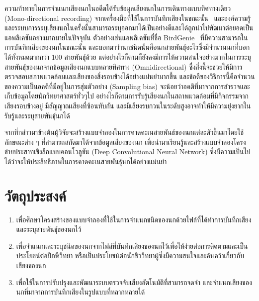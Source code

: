 ความท้าทายในการจำแนกเสียงนกในอดีตได้รับข้อมูลเสียงนกในการเดินทางแบบทิศทางเดียว (Mono-directional recording) จากเครื่องมือที่ใช้ในการบันทึกเสียงในขณะนั้น~\cite{Kahl2019} และองค์ความรู้และระบบการระบุเสียงนกในครั้งนั้นสามารถระบุออกมาได้เป็นอย่างดีและได้ถูกนำไปพัฒนาต่อยอดเป็นแอพลิเคชันอย่างมากมายในปัจจุบัน 
ตัวอย่างเช่นแอพลิเคชันที่ชื่อ BirdGenie~\cite{birdgenie} ที่มีความสามารถในการบันทึกเสียงของนกในขณะนั้น และบอกมาว่านกชนิดนั้นคือนกสายพันธุ์อะไรซึ่งมีจำนวนนกที่บอกได้ทั้งหมดมากกว่า 100 สายพันธุ์ด้วย แต่อย่างไรก็ตามก็ยังคงมีการให้ความสนใจอย่างมากในการระบุสายพันธุ์ของนกจากข้อมูลเสียงนกแบบหลายทิศทาง (Omnidirectional)
ซึ่งสิ่งนี้จะช่วยให้มีการตรวจสอบสภาพแวดล้อมและเสียงของสิ่งรอบข้างได้อย่างแม่นยำมากขึ้น และข้อดีของวิธีการนี้คือจำนวนของความเป็นอคติที่มีอยู่ในการสุ่มตัวอย่าง (Sampling bias) จะน้อยว่าอคติที่มาจากการสำรวจและเก็บข้อมูลโดยนักวิทยาศาสตร์ทั่วๆไป อย่างไรก็ตามการรับรู้เสียงนกในสถาพแวดล้อมที่มีกิจกรรมจากเสียงรอบข้างอยู่ 
มีสัญญาณเสียงที่ซ้อนทับกัน และมีเสียงรบกวนในระดับสูงอาจทำให้มีความยุ่งยากในรับรู้และระบุสายพันธุ์นกได้ \par

จากที่กล่าวมาข้างต้นผู้วิจัยจะสร้างแบบจำลองในการคาดคะเนสายพันธ์ของนกแต่ละตัวขึ้นมาโดยใช้ลักษณะต่าง ๆ ที่สามารถสกัดมาได้จากข้อมูลเสียงของนก เพื่อนำมาเรียนรู้และสร้างแบบจำลองโครงข่ายประสาทเชิงลึกแบบคอนโวลูชัน (Deep Convolutional Neural Network) 
ซึ่งมีความเป็นไปได้ว่าจะให้ประสิทธิภาพในการคาดคะเนสายพันธุ์นกได้อย่างแม่นยำ 

\section{วัตถุประสงค์}
\begin{enumerate}
    \item เพื่อศึกษาโครงสร้างของแบบจำลองที่ใช้ในการจำแนกชนิดของนกด้วยไฟล์ที่ได้ทำการบันทึกเสียงและระบุสายพันธุ์ของนกไว้
    \item เพื่อจำแนกและระบุชนิดของนกจากไฟล์ที่บันทึกเสียงของนกไว้เพื่อให้ง่ายต่อการติดตามและเป็นประโยชน์ต่อปักษีวิทยา หรือเป็นประโยชน์ต่อนักชีววิทยาผู้ซึ่งมีความสนใจและค้นคว้าเกี่ยวกับเสียงของนก
    \item เพื่อใช้ในการปรับปรุงและพัฒนาระบบตรวจจับเสียงอัตโนมัติที่สามารถจดจำ และจำแนกเสียงของนกที่มาจากการบันทึกเสียงในรูปแบบที่หลากหลายได้
\end{enumerate}

